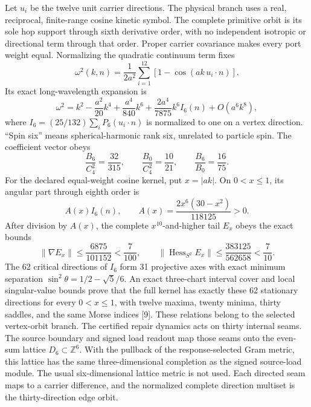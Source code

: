 \documentclass[10pt]{article}
\begin{document}
Let \(u_i\) be the twelve unit carrier directions. The physical branch uses a
real, reciprocal, finite-range cosine kinetic symbol. The complete primitive
orbit is its sole hop support through sixth derivative order, with no
independent isotropic or directional term through that order. Proper carrier
covariance makes every port weight equal. Normalizing the quadratic continuum
term fixes
\[
 \omega^2(k,n)=\frac{1}{2a^2}\sum_{i=1}^{12}
 \left[1-\cos\!\left(ak\,u_i\!\cdot n\right)\right].
\]
Its exact long-wavelength expansion is
\[
 \omega^2=k^2-\frac{a^2}{20}k^4+\frac{a^4}{840}k^6
 +\frac{2a^4}{7875}k^6 I_6(n)+O(a^6k^8),
\]
where \(I_6=(25/132)\sum_iP_6(u_i\cdot n)\) is normalized to one on a
vertex direction. ``Spin six'' means spherical-harmonic rank six, unrelated
to particle spin. The coefficient vector obeys
\[
 \frac{B_6}{C_4^2}=\frac{32}{315},\qquad
 \frac{B_0}{C_4^2}=\frac{10}{21},\qquad
 \frac{B_6}{B_0}=\frac{16}{75}.
\]
For the declared equal-weight cosine kernel, put \(x=|ak|\). On
\(0<x\le1\), its angular part through eighth order is
\[
 A(x)I_6(n),\qquad A(x)=\frac{2x^6(30-x^2)}{118125}>0.
\]
After division by \(A(x)\), the complete \(x^{10}\)-and-higher tail \(E_x\)
obeys the exact bounds
\[
 \|\nabla E_x\|\le\frac{6875}{101152}<\frac7{100},\qquad
 \|\operatorname{Hess}_{S^2}E_x\|
 \le\frac{383125}{562658}<\frac7{10}.
\]
The 62 critical directions of \(I_6\) form 31 projective axes with exact
minimum separation \(\sin^2\theta=1/2-\sqrt5/6\). An exact three-chart
interval cover and local singular-value bounds prove that the full kernel has
exactly these 62 stationary directions for every \(0<x\le1\), with twelve
maxima, twenty minima, thirty saddles, and the same Morse indices [9].
These relations belong to the selected vertex-orbit branch. The certified
repair dynamics acts on thirty internal seams. The source boundary and signed
load readout map those seams onto the even-sum lattice
\(D_6\subset\mathbb Z^6\). With the pullback of the response-selected Gram
metric, this lattice has the same three-dimensional completion as the signed
source-load module. The usual six-dimensional lattice metric is not used.
Each directed seam maps to a carrier difference, and the normalized complete
direction multiset is the thirty-direction edge orbit.
\end{document}
